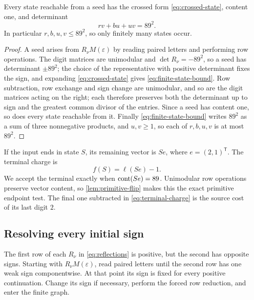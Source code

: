\begin{lemma}
\label{lem:state-invariants}
Every state reachable from a seed has the crossed form
\eqref{eq:crossed-state}, content one, and determinant
\begin{equation}
 rv+bu+uv=89^2.
 \label{eq:finite-state-bound}
\end{equation}
In particular $r,b,u,v\leqslant89^2$, so only finitely many states occur.
\end{lemma}

\begin{proof}
A seed arises from $R_\nu M(\varepsilon)$ by reading paired letters and
performing row operations. The digit matrices are unimodular and
$\det R_\nu=-89^2$, so a seed has determinant $\pm89^2$; the choice of the
representative with positive determinant fixes the sign, and expanding
\eqref{eq:crossed-state} gives \eqref{eq:finite-state-bound}. Row
subtraction, row exchange and sign change are unimodular, and so are the
digit matrices acting on the right; each therefore preserves both the
determinant up to sign and the greatest common divisor of the entries.
Since a seed has content one, so does every state reachable from it.
Finally \eqref{eq:finite-state-bound} writes $89^2$ as a sum of three
nonnegative products, and $u,v\geqslant1$, so each of $r,b,u,v$ is at most
$89^2$.
\end{proof}

If the input ends in state $S$, its remaining vector is $Se$, where
$e=(2,1)^{\mathsf T}$. The terminal charge is
\begin{equation}
 f(S)=\ell(Se)-1.
 \label{eq:terminal-charge}
\end{equation}
We accept the terminal exactly when $\operatorname{cont}\!\left(Se\right)=89$. Unimodular row
operations preserve vector content, so \cref{lem:primitive-flip} makes
this the exact primitive endpoint test. The final one subtracted in
\eqref{eq:terminal-charge} is the source cost of its last digit $2$.

\subsection{Resolving every initial sign}

The first row of each $R_\nu$ in \eqref{eq:reflections} is positive, but
the second has opposite signs. Starting with $R_\nu M(\varepsilon)$,
read paired letters until the second row has one weak sign componentwise.
At that point its sign is fixed for every positive continuation. Change
its sign if necessary, perform the forced row reduction, and enter the
finite graph.

